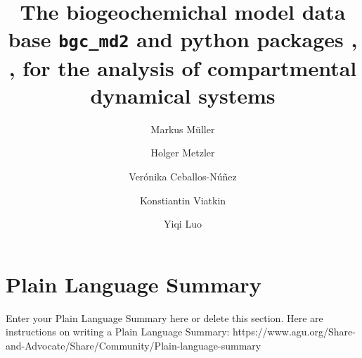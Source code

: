 
%
%

\title{The biogeochemichal model data base \texttt{bgc\_md2} and python
packages  \LAPM, \CompartmentalSystems, \ComputabilityGraphs for the analysis of compartmental dynamical systems}
%
%






\author[2]{M{arkus M{\"{u}}ller}}
\author[4]{Holger Metzler}
\author[3]{Ver{\'{o}}nika Ceballos-N{\'{u}}{\~{n}}ez}
\author[2]{Konstiantin Viatkin}
\author[2]{Yiqi Luo}
\affil[3]{}
\affil[4]{}

\begin{abstract} \noindent
  
\end{abstract}

\section*{Plain Language Summary}
Enter your Plain Language Summary here or delete this section.
Here are instructions on writing a Plain Language Summary: 
https://www.agu.org/Share-and-Advocate/Share/Community/Plain-language-summary


